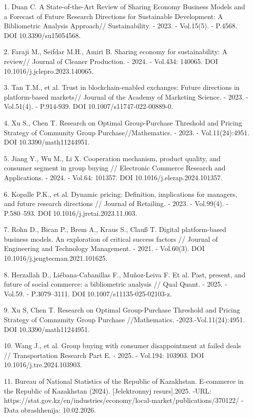 \begin{refs}
1. Duan C. A State-of-the-Art Review of Sharing Economy Business Models
and a Forecast of Future Research Directions for Sustainable
Development: A Bibliometric Analysis Approach// Sustainability. - 2023.
- Vol.15(5). - P.4568. DOI 10.3390/su15054568.

2. Faraji M., Seifdar M.H., Amiri B. Sharing economy for sustainability:
A review// Journal of Cleaner Production. - 2024. - Vol.434: 140065.
DOI 10.1016/j.jclepro.2023.140065.

3. Tan T.M., et al. Trust in blockchain-enabled exchanges: Future
directions in platform-based markets// Journal of the Academy of
Marketing Science. - 2023. - Vol.51(4). - P.914-939. DOI
10.1007/s11747-022-00889-0.

4. Xu S., Chen T. Research on Optimal Group-Purchase Threshold and
Pricing Strategy of Community Group Purchase//Mathematics. - 2023. -
Vol.11(24):4951. DOI 10.3390/math11244951.

5. Jiang Y., Wu M., Li X. Cooperation mechanism, product quality, and
consumer segment in group buying // Electronic Commerce Research and
Applications. - 2024. - Vol.64: 101357. DOI
10.1016/j.elerap.2024.101357.

6. Kopalle P.K., et al. Dynamic pricing: Definition, implications for
managers, and future research directions // Journal of Retailing. -
2023. - Vol.99(4). - P.580--593. DOI 10.1016/j.jretai.2023.11.003.

7. Rohn D., Bican P., Brem A., Kraus S., Clauß T. Digital platform-based
business models. An exploration of critical success factors // Journal
of Engineering and Technology Management. - 2021. - Vol.60(3). DOI
10.1016/j.jengtecman.2021.101625.

8. Herzallah D., Liébana-Cabanillas F., Muñoz-Leiva F. Et al. Past,
present, and future of social commerce: a bibliometric analysis // Qual
Quant. - 2025. - Vol.59. - P.3079--3111. DOI
10.1007/s11135-025-02103-z.

9. Xu S, Chen T. Research on Optimal Group-Purchase Threshold and
Pricing Strategy of Community Group Purchase //Mathematics.
-2023.-Vol.11(24):4951. DOI 10.3390/math11244951.

10. Wang J., et al. Group buying with consumer disappointment at failed
deals // Transportation Research Part E. - 2025. - Vol.194: 103903. DOI
10.1016/j.tre.2024.103903.

11. Bureau of National Statistics of the Republic of Kazakhstan.
E-commerce in the Republic of Kazakhstan (2024). {[}Jelektronnyj
resurs{]}.2025. -URL:
https://stat.gov.kz/en/industries/economy/local-market/publications/370122/
- Data obrashhenija: 10.02.2026.


\end{refs}
